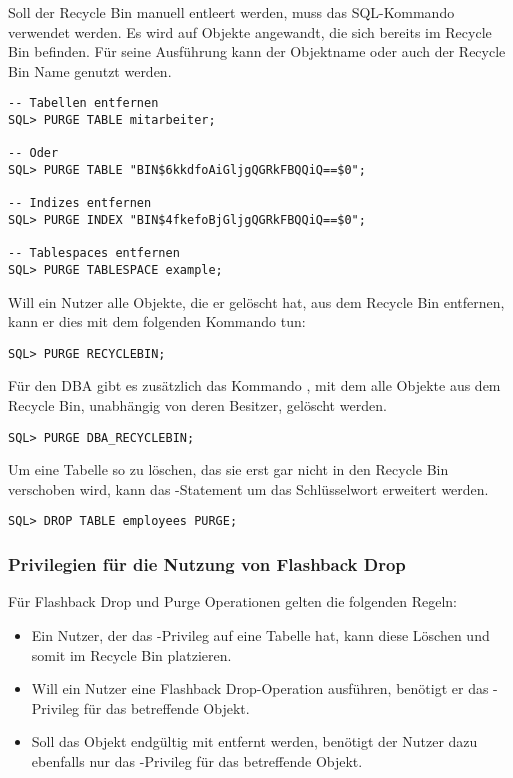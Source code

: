           Soll der Recycle Bin manuell entleert werden, muss das SQL-Kommando  verwendet werden. Es wird auf Objekte angewandt, die sich bereits im Recycle Bin befinden. Für seine Ausführung kann der Objektname oder auch der Recycle Bin Name genutzt werden.
          \begin{lstlisting}[caption={Das Kommando \languageorasql{PURGE}},label=admin1717,language=oracle_sql]
-- Tabellen entfernen
SQL> PURGE TABLE mitarbeiter;

-- Oder
SQL> PURGE TABLE "BIN$6kkdfoAiGljgQGRkFBQQiQ==$0";

-- Indizes entfernen
SQL> PURGE INDEX "BIN$4fkefoBjGljgQGRkFBQQiQ==$0";

-- Tablespaces entfernen
SQL> PURGE TABLESPACE example;
          \end{lstlisting}
          Will ein Nutzer alle Objekte, die er gelöscht hat, aus dem Recycle Bin entfernen, kann er dies mit dem folgenden Kommando tun:
          \begin{lstlisting}[caption={Das Kommando \languageorasql{PURGE RECYCLEBIN}},label=admin1718,language=oracle_sql]
SQL> PURGE RECYCLEBIN;
          \end{lstlisting}
          Für den DBA gibt es zusätzlich das Kommando , mit dem alle Objekte aus dem Recycle Bin, unabhängig von deren Besitzer, gelöscht werden.
          \begin{lstlisting}[caption={Das Kommando \languageorasql{PURGE DBA_RECYCLEBIN}},label=admin1719,language=oracle_sql]
SQL> PURGE DBA_RECYCLEBIN;
          \end{lstlisting}
          Um eine Tabelle so zu löschen, das sie erst gar nicht in den Recycle Bin verschoben wird, kann das -Statement um das Schlüsselwort  erweitert werden.
          \begin{lstlisting}[caption={\languageorasql{DROP TABLE PURGE}},label=admin1720,language=oracle_sql]
SQL> DROP TABLE employees PURGE;
          \end{lstlisting}
        \subsubsection{Privilegien für die Nutzung von Flashback Drop}
          Für Flashback Drop und Purge Operationen gelten die folgenden Regeln:
          \begin{itemize}
            \item Ein Nutzer, der das -Privileg auf eine Tabelle hat, kann diese Löschen und somit im Recycle Bin platzieren.
            \item Will ein Nutzer eine Flashback Drop-Operation ausführen, benötigt er das -Privileg für das betreffende Objekt.
            \item Soll das Objekt endgültig mit  entfernt werden, benötigt der Nutzer dazu ebenfalls nur das -Privileg für das betreffende Objekt.
          \end{itemize}
